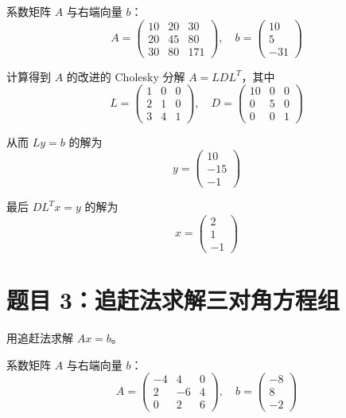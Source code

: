 \documentclass{article}
\begin{document}
系数矩阵 $A$ 与右端向量 $b$：
\[
  A =
  \begin{pmatrix}
    10 & 20 & 30 \\
    20 & 45 & 80 \\
    30 & 80 & 171
  \end{pmatrix}, \quad
  b =
  \begin{pmatrix}
    10 \\ 5 \\ -31
  \end{pmatrix}
\]

\begin{solution}
  计算得到 $A$ 的改进的 Cholesky 分解 $A = LDL^T$，其中
  \[
    L =
    \begin{pmatrix}
      1 & 0 & 0\\
      2 & 1 & 0\\
      3 & 4 & 1
    \end{pmatrix}, \quad
    D =
    \begin{pmatrix}
      10 & 0 & 0\\
      0 & 5 & 0\\
      0 & 0 & 1
    \end{pmatrix}
  \]

  从而 $Ly = b$ 的解为
  \[
    y =
    \begin{pmatrix}
      10\\-15\\-1
    \end{pmatrix}
  \]

  最后 $DL^T x = y$ 的解为
  \[
    x =
    \begin{pmatrix}
      2\\1\\-1
    \end{pmatrix}
  \]

\end{solution}

\section{题目 3：追赶法求解三对角方程组}

用追赶法求解 $Ax = b$。

系数矩阵 $A$ 与右端向量 $b$：
\[
  A =
  \begin{pmatrix}
    -4 & 4 & 0 \\
    2 & -6 & 4 \\
    0 & 2 & 6
  \end{pmatrix}, \quad
  b =
  \begin{pmatrix}
    -8 \\ 8 \\ -2
  \end{pmatrix}
\]
\end{document}

